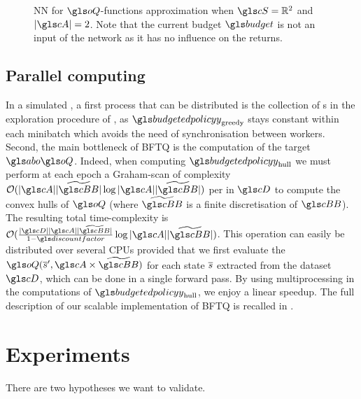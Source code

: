 \begin{figure}[tp]
    \centering
    
    \caption[A Budgeted Fitted-$Q$ Neural-Network]{\acrlong{NN} for $\oQ$-functions approximation when $\cS=\Real^2$ and $|\cA| = 2$. Note that the current budget $\budget$ is not an input of the network as it has no influence on the returns.}
    \label{fig:architecture}
\end{figure}

\subsection{Parallel computing}
\label{subsec:parallel-computing}
In a simulated , a first process that can be distributed is the collection of s in the exploration procedure of , as $\budgetedpolicy_\text{greedy}$ stays constant within each minibatch which avoids the need of synchronisation between workers. Second, the main bottleneck of \gls{BFTQ} is the computation of the target $\abo \oQ$. Indeed, when computing $\budgetedpolicy_\text{hull}$ we must perform at each epoch a Graham-scan of complexity $\cO(|\cA||\tilde{\budgetspace}| \log |\cA||\tilde{\budgetspace}|)$ per  in $\cD$ to compute the convex hulls of $\oQ$ (where $\tilde{\budgetspace}$ is a finite discretisation of $\budgetspace$). The resulting total time-complexity is $\cO(\frac{|\cD||\cA||\tilde{\budgetspace}|}{1-\discountfactor} \log |\cA||\tilde{\budgetspace}|)$. This operation can easily be distributed over several CPUs provided that we first evaluate the  $\oQ(\os',\cA \times \tilde{\budgetspace})$ for each state $\overline{s}$ extracted from the dataset $\cD$, which can be done in a single forward pass. By using multiprocessing in the computations of $\budgetedpolicy_\text{hull}$, we enjoy a linear speedup.
The full description of our scalable implementation of \gls{BFTQ} is recalled in .



\section{Experiments}
\label{sec:experiements}
There are two hypotheses we want to validate.

